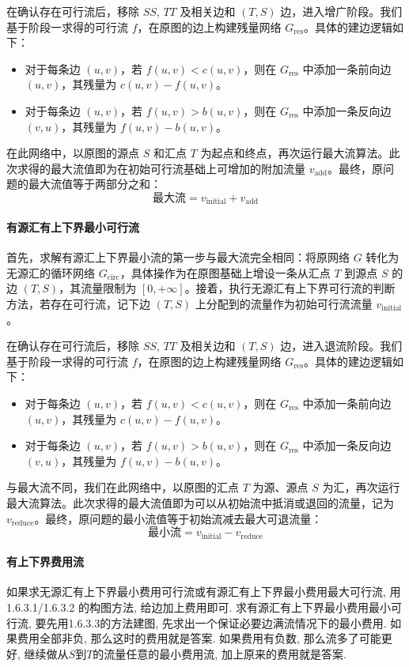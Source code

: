   在确认存在可行流后，移除 $SS$, $TT$ 及相关边和 $(T, S)$ 边，进入增广阶段。我们基于阶段一求得的可行流 $f$，在原图的边上构建残量网络 $G_{\text{res}}$。具体的建边逻辑如下：
\begin{itemize}
    \item 对于每条边 $(u,v)$，若 $f(u,v) < c(u,v)$，则在 $G_{\text{res}}$ 中添加一条前向边 $(u,v)$，其残量为 $c(u,v) - f(u,v)$。
    \item 对于每条边 $(u,v)$，若 $f(u,v) > b(u,v)$，则在 $G_{\text{res}}$ 中添加一条反向边 $(v,u)$，其残量为 $f(u,v) - b(u,v)$。
\end{itemize}
在此网络中，以原图的源点 $S$ 和汇点 $T$ 为起点和终点，再次运行最大流算法。此次求得的最大流值即为在初始可行流基础上可增加的附加流量 $v_{\text{add}}$。最终，原问题的最大流值等于两部分之和：
$$ \text{最大流} = v_{\text{initial}} + v_{\text{add}} $$

\paragraph{有源汇有上下界最小可行流}
首先，求解有源汇上下界最小流的第一步与最大流完全相同：将原网络 $G$ 转化为无源汇的循环网络 $G_{\text{circ}}$，具体操作为在原图基础上增设一条从汇点 $T$ 到源点 $S$ 的边 $(T, S)$，其流量限制为 $[0, +\infty]$。接着，执行无源汇有上下界可行流的判断方法，若存在可行流，记下边 $(T, S)$ 上分配到的流量作为初始可行流流量 $v_{\text{initial}}$。

在确认存在可行流后，移除 $SS$, $TT$ 及相关边和 $(T, S)$ 边，进入退流阶段。我们基于阶段一求得的可行流 $f$，在原图的边上构建残量网络 $G_{\text{res}}$。具体的建边逻辑如下：
\begin{itemize}
    \item 对于每条边 $(u,v)$，若 $f(u,v) < c(u,v)$，则在 $G_{\text{res}}$ 中添加一条前向边 $(u,v)$，其残量为 $c(u,v) - f(u,v)$。
    \item 对于每条边 $(u,v)$，若 $f(u,v) > b(u,v)$，则在 $G_{\text{res}}$ 中添加一条反向边 $(v,u)$，其残量为 $f(u,v) - b(u,v)$。
\end{itemize}
与最大流不同，我们在此网络中，以原图的汇点 $T$ 为源、源点 $S$ 为汇，再次运行最大流算法。此次求得的最大流值即为可以从初始流中抵消或退回的流量，记为 $v_{\text{reduce}}$。最终，原问题的最小流值等于初始流减去最大可退流量：
$$ \text{最小流} = v_{\text{initial}} - v_{\text{reduce}} $$


\paragraph{有上下界费用流}
如果求无源汇有上下界最小费用可行流或有源汇有上下界最小费用最大可行流, 用1.6.3.1/1.6.3.2 的构图方法, 给边加上费用即可. 
求有源汇有上下界最小费用最小可行流, 要先用1.6.3.3的方法建图, 先求出一个保证必要边满流情况下的最小费用. 如果费用全部非负, 那么这时的费用就是答案. 如果费用有负数, 那么流多了可能更好, 继续做从$S$到$T$的流量任意的最小费用流, 加上原来的费用就是答案. 

